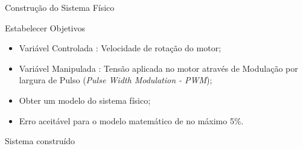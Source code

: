 \begin{frame}{Construção do Sistema Físico}
\begin{figure}[!htb]
\end{figure}

\end{frame}


\begin{frame}{Estabelecer Objetivos}

\begin{itemize}
\item Variável Controlada : Velocidade de rotação do motor;
\item Variável Manipulada : Tensão aplicada no motor através de Modulação por largura de Pulso (\emph{Pulse Width Modulation - PWM});
\item Obter um modelo do sistema físico;
\item Erro aceitável para o modelo matemático de no máximo 5\%.
\end{itemize}

\end{frame}


\begin{frame}{Sistema construído}

\begin{figure}[!htb]

\end{figure}

\end{frame}

